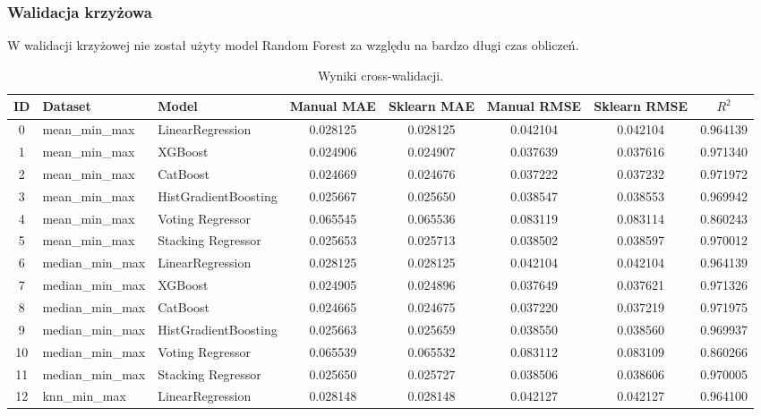 \documentclass[10pt,letterpaper]{article}
\begin{document}
\newpage
\begin{landscape}
\subsubsection{Walidacja krzyżowa}
W walidacji krzyżowej nie został użyty model Random Forest za względu na bardzo długi czas obliczeń.

\begin{table}[H]
	\centering
	\caption{Wyniki cross-walidacji.}
	\label{tab:results_cross}
	\begin{tabular}{|c|l|l|c|c|c|c|c|}
	
	\textbf{ID} & \textbf{Dataset} & \textbf{Model} & \textbf{Manual MAE} & \textbf{Sklearn MAE} & \textbf{Manual RMSE} & \textbf{Sklearn RMSE} & \textbf{\(R^2\)} \\ 
	\hline
0 & mean\_min\_max & LinearRegression & 0.028125 & 0.028125 & 0.042104 & 0.042104 & 0.964139 \\ \hline
1 & mean\_min\_max & XGBoost & 0.024906 & 0.024907 & 0.037639 & 0.037616 & 0.971340 \\ \hline
2 & mean\_min\_max & CatBoost & 0.024669 & 0.024676 & 0.037222 & 0.037232 & 0.971972 \\ \hline
3 & mean\_min\_max & HistGradientBoosting & 0.025667 & 0.025650 & 0.038547 & 0.038553 & 0.969942 \\ \hline
4 & mean\_min\_max & Voting Regressor & 0.065545 & 0.065536 & 0.083119 & 0.083114 & 0.860243 \\ \hline
5 & mean\_min\_max & Stacking Regressor & 0.025653 & 0.025713 & 0.038502 & 0.038597 & 0.970012 \\ \hline
6 & median\_min\_max & LinearRegression & 0.028125 & 0.028125 & 0.042104 & 0.042104 & 0.964139 \\ \hline
7 & median\_min\_max & XGBoost & 0.024905 & 0.024896 & 0.037649 & 0.037621 & 0.971326 \\ \hline
8 & median\_min\_max & CatBoost & 0.024665 & 0.024675 & 0.037220 & 0.037219 & 0.971975 \\ \hline
9 & median\_min\_max & HistGradientBoosting & 0.025663 & 0.025659 & 0.038550 & 0.038560 & 0.969937 \\ \hline
10 & median\_min\_max & Voting Regressor & 0.065539 & 0.065532 & 0.083112 & 0.083109 & 0.860266 \\ \hline
11 & median\_min\_max & Stacking Regressor & 0.025650 & 0.025727 & 0.038506 & 0.038606 & 0.970005 \\ \hline
12 & knn\_min\_max & LinearRegression & 0.028148 & 0.028148 & 0.042127 & 0.042127 & 0.964100 \\ \hline

\end{tabular}
\end{table}
\end{landscape}
\end{document}
